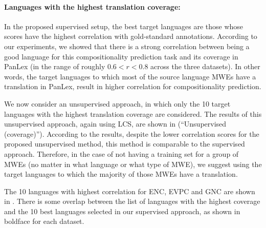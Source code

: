 \documentclass[output=paper
,modfonts
,nonflat]{langsci/langscibook}
\begin{document}
\paragraph*{Languages with the highest translation coverage:}

In the proposed supervised setup, the best target languages are those
whose scores have the highest correlation with gold-standard
annotations.  According to our experiments, we showed that there is a
strong correlation between being a good language for this
compositionality prediction task and its coverage in PanLex (in the
range of roughly $0.6 < r < 0.8$ across the three datasets). In other words, the
target languages to which most of the source language MWEs have a
translation in PanLex, result in higher correlation for
compositionality prediction.

We now consider an unsupervised approach, in which only the 10
target languages with the highest translation coverage are
considered. The results of this unsupervised approach, again using
LCS, are shown in  (``Unsupervised
(coverage)''). According to the results, despite the lower correlation
scores for the proposed unsupervised method, this method is comparable
to the supervised approach.  Therefore, in the case of not having a
training set for a group of MWEs (no matter in what language or what
type of MWE), we suggest using the target languages to which the
majority of those MWEs have a translation.

The 10 languages with highest correlation for ENC, EVPC and GNC are
shown in . There is some overlap between the
list of languages with the highest coverage and the 10 best languages
selected in our supervised approach, as shown in boldface for each
dataset.
\end{document}
